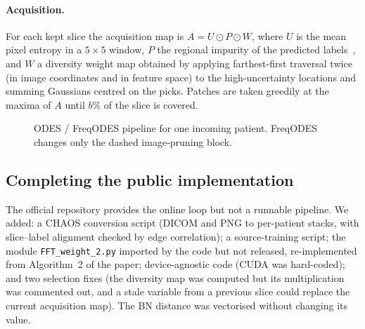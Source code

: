 \documentclass[a4paper,fleqn]{cas-sc}
\begin{document}
\paragraph{Acquisition.} For each kept slice the acquisition map is $A=U\odot P\odot W$, where $U$ is the mean pixel entropy in a $5\times5$ window, $P$ the regional impurity of the predicted labels~\cite{xie2022ripu}, and $W$ a diversity weight map obtained by applying farthest-first traversal twice (in image coordinates and in feature space) to the high-uncertainty locations and summing Gaussians centred on the picks. Patches are taken greedily at the maxima of $A$ until $b\%$ of the slice is covered.

\begin{figure}[t]
\centering
{}
\caption{ODES / FreqODES pipeline for one incoming patient. FreqODES changes only the dashed image-pruning block.}
\label{fig:arch}
\end{figure}

\subsection{Completing the public implementation}
The official repository provides the online loop but not a runnable pipeline. We added: a CHAOS conversion script (DICOM and PNG to per-patient stacks, with slice--label alignment checked by edge correlation); a source-training script; the module \texttt{FFT\_weight\_2.py} imported by the code but not released, re-implemented from Algorithm~2 of the paper; device-agnostic code (CUDA was hard-coded); and two selection fixes (the diversity map was computed but its multiplication was commented out, and a stale variable from a previous slice could replace the current acquisition map). The BN distance was vectorised without changing its value.
\end{document}
